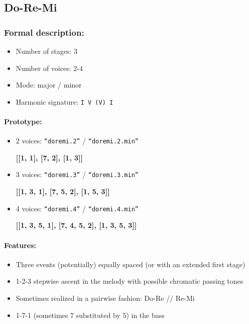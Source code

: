\documentclass[11pt, openany]{article}
\begin{document}
	\subsection{Do-Re-Mi}
	
\subsubsection{Formal description:}
\begin{itemize}
\item Number of stages: 3
\item Number of voices: 2-4
\item Mode: major / minor
\item Harmonic signature: \texttt{I V (V) I}
\end{itemize}

\paragraph{Prototype:}
\begin{itemize}
\item 2 voices: \texttt{“doremi.2”} / \texttt{“doremi.2.min”}
	\begin{center}
    \textbf{[[1, 1], [7, 2], [1, 3]]}
    \end{center}
\item 3 voices: \texttt{“doremi.3”} / \texttt{“doremi.3.min”}
	\begin{center}
    \textbf{[[1, 3, 1], [7, 5, 2], [1, 5, 3]]}
    \end{center}
\item 4 voices: \texttt{“doremi.4”} / \texttt{“doremi.4.min”}
	\begin{center}
    \textbf{[[1, 3, 5, 1], [7, 4, 5, 2], [1, 3, 5, 3]]}
    \end{center}
\end{itemize}

\paragraph{Features:}
\begin{itemize}
\item Three events (potentially) equally spaced (or with an extended first stage)
\item 1-2-3 stepwise ascent in the melody with possible chromatic passing tones
\item Sometimes realized in a pairwise fashion: Do-Re // Re-Mi
\item 1-7-1 (sometimes 7 substituted by 5) in the bass
\end{itemize}
\end{document}
